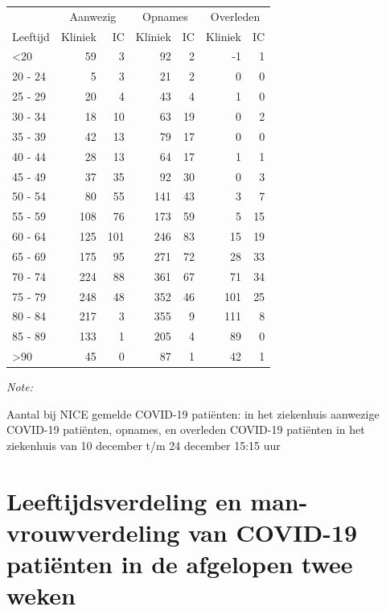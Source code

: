 \documentclass[
  english,
  man,floatsintext]{apa6}
\begin{document}
\begin{table}
\centering\begingroup\fontsize{10}{12}\selectfont

\begin{threeparttable}
\begin{tabular}{lrrrrrr}
\toprule
\multicolumn{1}{c}{ } & \multicolumn{2}{c}{Aanwezig} & \multicolumn{2}{c}{Opnames} & \multicolumn{2}{c}{Overleden} \\
\cmidrule(l{3pt}r{3pt}){2-3} \cmidrule(l{3pt}r{3pt}){4-5} \cmidrule(l{3pt}r{3pt}){6-7}
Leeftijd & Kliniek & IC & Kliniek & IC & Kliniek & IC\\
\midrule
<20 & 59 & 3 & 92 & 2 & -1 & 1\\
20 - 24 & 5 & 3 & 21 & 2 & 0 & 0\\
25 - 29 & 20 & 4 & 43 & 4 & 1 & 0\\
30 - 34 & 18 & 10 & 63 & 19 & 0 & 2\\
35 - 39 & 42 & 13 & 79 & 17 & 0 & 0\\
40 - 44 & 28 & 13 & 64 & 17 & 1 & 1\\
45 - 49 & 37 & 35 & 92 & 30 & 0 & 3\\
50 - 54 & 80 & 55 & 141 & 43 & 3 & 7\\
55 - 59 & 108 & 76 & 173 & 59 & 5 & 15\\
60 - 64 & 125 & 101 & 246 & 83 & 15 & 19\\
65 - 69 & 175 & 95 & 271 & 72 & 28 & 33\\
70 - 74 & 224 & 88 & 361 & 67 & 71 & 34\\
75 - 79 & 248 & 48 & 352 & 46 & 101 & 25\\
80 - 84 & 217 & 3 & 355 & 9 & 111 & 8\\
85 - 89 & 133 & 1 & 205 & 4 & 89 & 0\\
>90 & 45 & 0 & 87 & 1 & 42 & 1\\
\bottomrule
\end{tabular}
\begin{tablenotes}
\item \textit{Note: } 
\item Aantal bij NICE gemelde COVID-19 patiënten: in het ziekenhuis aanwezige COVID-19 patiënten, opnames, en overleden COVID-19 patiënten in het ziekenhuis van 10 december t/m 24 december 15:15 uur
\end{tablenotes}
\end{threeparttable}
\endgroup{}
\end{table}

\newpage

\hypertarget{leeftijdsverdeling-en-man-vrouwverdeling-van-covid-19-patiuxebnten-in-de-afgelopen-twee-weken}{%
\section{Leeftijdsverdeling en man-vrouwverdeling van COVID-19 patiënten in de afgelopen twee weken}\label{leeftijdsverdeling-en-man-vrouwverdeling-van-covid-19-patiuxebnten-in-de-afgelopen-twee-weken}}
\end{document}
